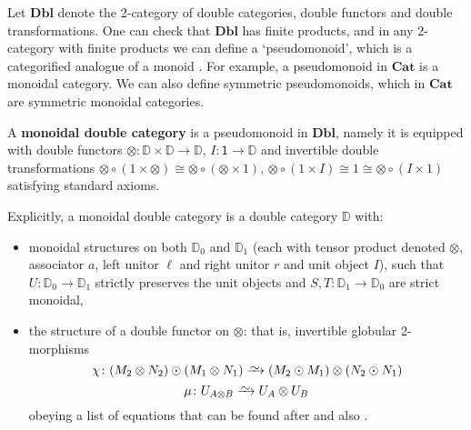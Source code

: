 \documentclass[ a4paper, onecolumn, superscriptaddress,10pt, accepted=2022-02-14, issue=3, volume=4, shorttitle=papers/compositionality-4-3 ]{compositionalityarticle}
\newcommand{\simrightarrow}{\xrightarrow{\raisebox{-3pt}[0pt][0pt]{\ensuremath{\sim}}}}
\let\maps\colon
\newcommand{\one}{\mathsf{1}}
\newcommand{\bicat}{\mathbf}
\newcommand{\Dbl}{\bicat{Dbl}}
\newcommand{\Cat}{\bicat{Cat}}
\newcommand{\double}[1]{\mathbf{\mathbb #1}}
\newcommand{\lD}{\double{D}}
\newcommand{\define}[1]{{\rm \textbf{#1}}}
\begin{document}
Let $\Dbl$ denote the 2-category of double categories, double functors and double transformations. One can check that $\Dbl$ has finite products, and in any 2-category with finite products we can define a `pseudomonoid', which is a categorified analogue of a monoid \cite{DS}. For example, a pseudomonoid in $\Cat$ is a monoidal category.   We can also define symmetric pseudomonoids, which in $\Cat$ are symmetric monoidal categories.

\begin{defn}
\label{defn:monoidal_double_category}
A \define{monoidal double category} is a pseudomonoid in $\Dbl$, namely it is equipped with double functors $\otimes\maps\lD\times\lD\to\lD$, $I\maps\one\to\lD$ and invertible double transformations $\otimes\circ(1\times\otimes)\cong\otimes\circ(\otimes\times1)$, $\otimes\circ(1\times I)\cong1\cong\otimes\circ(I\times1)$ satisfying standard axioms.
\end{defn}
\noindent
Explicitly, a monoidal double category is a double category $\lD$ with:
\begin{itemize}
\item monoidal structures on both $\lD_0$ and $\lD_1$ (each with tensor product denoted $\otimes$, associator $a$, left unitor $\ell$ and right unitor $r$ and unit object $I$), such that $U \maps \lD_0 \to \lD_1$ strictly preserves the unit objects and $S,T \maps \lD_1 \to \lD_0$ are strict monoidal,
\item the structure of a double functor on $\otimes$:
that is, invertible globular 2-morphisms
\[ \chi \maps (M_2\otimes N_2)\odot(M_1\otimes N_1)  \simrightarrow
(M_2\odot M_1)\otimes (N_2\odot N_1)\]
\[ \mu \maps U_{A\otimes B} \simrightarrow U_A \otimes U_B\]
obeying a list of equations that can be found after \cite[Definition 2.10]{HS} and also \cite[Definition A.5]{BC}.
\end{itemize}
\end{document}
